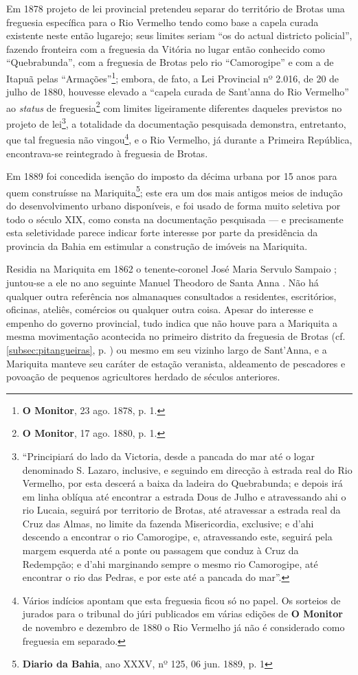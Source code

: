 Em 1878 projeto de lei provincial pretendeu separar do território de Brotas uma freguesia específica para o Rio Vermelho tendo como base a capela curada existente neste então lugarejo; seus limites seriam ``os do actual districto policial'', fazendo fronteira com a freguesia da Vitória no lugar então conhecido como ``Quebrabunda'', com a freguesia de Brotas pelo rio ``Camorogipe'' e com a de Itapuã pelas ``Armações''\footnote{\textbf{O Monitor}, 23 ago. 1878, p. 1.}; embora, de fato, a Lei Provincial nº 2.016, de 20 de julho de 1880, houvesse elevado a ``capela curada de Sant'anna do Rio Vermelho'' ao \textit{status} de freguesia\footnote{\textbf{O Monitor}, 17 ago. 1880, p. 1.} com limites ligeiramente diferentes daqueles previstos no projeto de lei\footnote{``Principiará do lado da Victoria, desde a pancada do mar até o logar denominado S. Lazaro, inclusive, e seguindo em direcção à estrada real do Rio Vermelho, por esta descerá a baixa da ladeira do Quebrabunda; e depois irá em linha oblíqua até encontrar a estrada Dous de Julho e atravessando ahi o rio Lucaia, seguirá por territorio de Brotas, até atravessar a estrada real da Cruz das Almas, no limite da fazenda Misericordia, exclusive; e d'ahi descendo a encontrar o rio Camorogipe, e, atravessando este, seguirá pela margem esquerda até a ponte ou passagem que conduz à Cruz da Redempção; e d'ahi marginando sempre o mesmo rio Camorogipe, até encontrar o rio das Pedras, e por este até a pancada do mar''.}, a totalidade da documentação pesquisada demonstra, entretanto, que tal freguesia não vingou\footnote{Vários indícios apontam que esta freguesia ficou só no papel. Os sorteios de jurados para o tribunal do júri publicados em várias edições de \textbf{O Monitor} de novembro e dezembro de 1880 o Rio Vermelho já não é considerado como freguesia em separado.}, e o Rio Vermelho, já durante a Primeira República, encontrava-se reintegrado à freguesia de Brotas.

Em 1889 foi concedida isenção do imposto da décima urbana por 15 anos para quem construísse na Mariquita\footnote{\textbf{Diario da Bahia}, ano XXXV, nº 125, 06 jun. 1889, p. 1}; este era um dos mais antigos meios de indução do desenvolvimento urbano disponíveis, e foi usado de forma muito seletiva por todo o século XIX, como consta na documentação pesquisada --- e precisamente esta seletividade parece indicar forte interesse por parte da presidência da provincia da Bahia em estimular a construção de imóveis na Mariquita.

Residia na Mariquita em 1862 o tenente-coronel José Maria Servulo Sampaio \cite[p.~232]{masson_almanak_1862}; juntou-se a ele no ano seguinte Manuel Theodoro de Santa Anna \cite[p.~260]{masson_almanak_1863}. Não há qualquer outra referência nos almanaques consultados a residentes, escritórios, oficinas, ateliês, comércios ou qualquer outra coisa. Apesar do interesse e empenho do governo provincial, tudo indica que não houve para a Mariquita a mesma movimentação acontecida no primeiro distrito da freguesia de Brotas (cf. \autoref{subsec:pitangueiras}, p. \pageref{subsec:pitangueiras}) ou mesmo em seu vizinho largo de Sant'Anna, e a Mariquita manteve seu caráter de estação veranista, aldeamento de pescadores e povoação de pequenos agricultores herdado de séculos anteriores.

